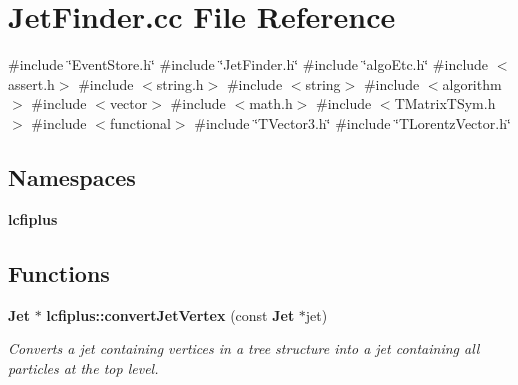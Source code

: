\section{Jet\+Finder.\+cc File Reference}
\label{JetFinder_8cc}
{\ttfamily \#include \char`\"{}Event\+Store.\+h\char`\"{}}\newline
{\ttfamily \#include \char`\"{}Jet\+Finder.\+h\char`\"{}}\newline
{\ttfamily \#include \char`\"{}algo\+Etc.\+h\char`\"{}}\newline
{\ttfamily \#include $<$assert.\+h$>$}\newline
{\ttfamily \#include $<$string.\+h$>$}\newline
{\ttfamily \#include $<$string$>$}\newline
{\ttfamily \#include $<$algorithm$>$}\newline
{\ttfamily \#include $<$vector$>$}\newline
{\ttfamily \#include $<$math.\+h$>$}\newline
{\ttfamily \#include $<$T\+Matrix\+T\+Sym.\+h$>$}\newline
{\ttfamily \#include $<$functional$>$}\newline
{\ttfamily \#include \char`\"{}T\+Vector3.\+h\char`\"{}}\newline
{\ttfamily \#include \char`\"{}T\+Lorentz\+Vector.\+h\char`\"{}}\newline
\subsection*{Namespaces}
\begin{DoxyCompactItemize}
\item 
 \textbf{ lcfiplus}
\end{DoxyCompactItemize}
\subsection*{Functions}
\begin{DoxyCompactItemize}
\item 
\textbf{ Jet} $\ast$ \textbf{ lcfiplus\+::convert\+Jet\+Vertex} (const \textbf{ Jet} $\ast$jet)
\begin{DoxyCompactList}\small\item\em Converts a jet containing vertices in a tree structure into a jet containing all particles at the top level. \end{DoxyCompactList}\end{DoxyCompactItemize}
